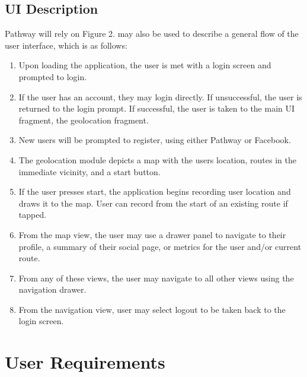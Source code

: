 \documentclass{article}
\begin{document}
\subsection{UI Description}
Pathway will rely on
Figure 2. may also be used to describe a general flow of the user interface, which is as follows:
\begin{enumerate}
    \item Upon loading the application, the user is met with a login screen and prompted to login.
    \item If the user has an account, they may login directly.
    \subitem If unsuccessful, the user is returned to the login prompt.
    \subitem If successful, the user is taken to the main UI fragment, the geolocation fragment.
    \item New users will be prompted to register, using either Pathway or Facebook.
    \item The geolocation module depicts a map with the users location, routes in the immediate vicinity, and a start button.
    \item If the user presses start, the application begins recording user location and draws it to the map.
    \subitem User can record from the start of an existing route if tapped.
    \item From the map view, the user may use a drawer panel to navigate to their profile, a summary of their social page, or metrics for the user and/or current route.
    \item From any of these views, the user may navigate to all other views using the navigation drawer.
    \item From the navigation view, user may select logout to be taken back to the login screen.
\end{enumerate}

\section{User Requirements}
\end{document}
